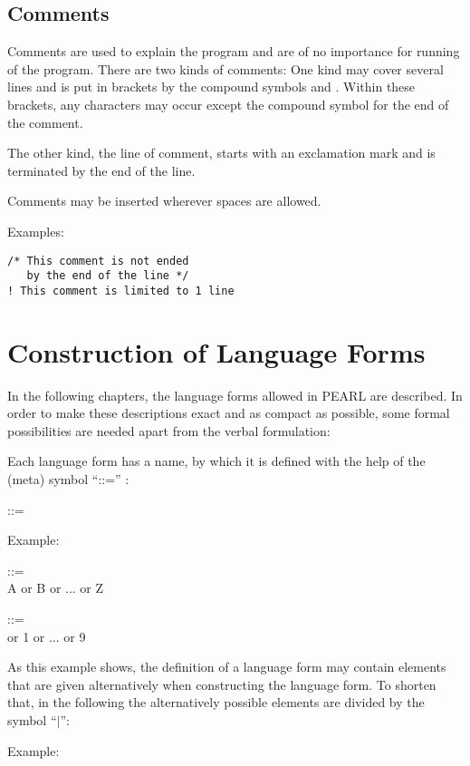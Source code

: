 \subsection{Comments}    %

Comments are used to explain the program and are of no importance for
running of the program. There are two kinds of comments: One kind may
cover several lines and is put in brackets by the compound symbols \code{/*}
and \code{*/}. Within these brackets, any characters may occur except the
compound symbol \code{*/} for the end of the comment.

The other kind, the line of comment, starts with an exclamation
mark \code{!} and is terminated by the end of the line.

Comments may be inserted wherever spaces are allowed.

Examples:

\begin{lstlisting}
/* This comment is not ended
   by the end of the line */
! This comment is limited to 1 line
\end{lstlisting}

\section{Construction of Language Forms}  %

In the following chapters, the language forms allowed in PEARL are
described.  In order to make these descriptions exact and as compact as
possible, some formal possibilities are needed apart from the verbal
formulation:

Each language form has a name, by which it is defined with the help of
the (meta) symbol ``::='' :

 ::=\\
\x {}

Example:

 ::=\\
\x A or B or ... or Z

 ::=\\
 or 1 or ... or 9

As this example shows, the definition of a language form may contain
elements that are given alternatively when constructing the language
form. To shorten that, in the following the alternatively possible
elements are divided by the symbol ``$\mid$'':

Example:

